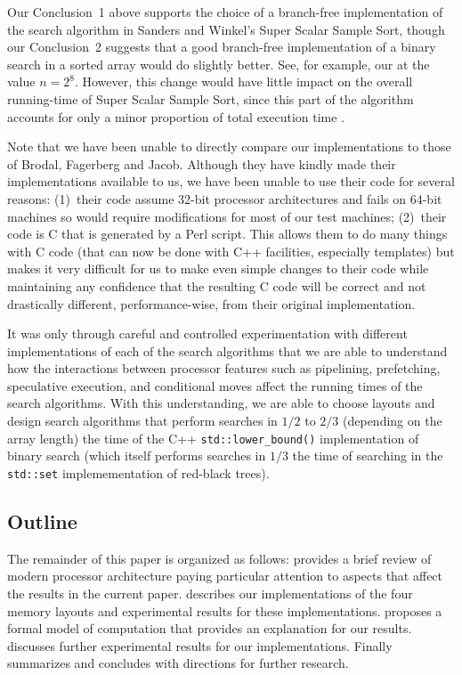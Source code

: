\documentclass{patmorin}
\begin{document}
Our Conclusion~1 above supports the choice of a branch-free implementation
of the search algorithm in Sanders and Winkel's Super Scalar Sample Sort,
though our Conclusion~2 suggests that a good branch-free implementation
of a binary search in a sorted array would do slightly better. See,
for example, our  at the value $n=2^8$.
However, this change would have little impact on the overall
running-time of Super Scalar Sample Sort, since this part of the
algorithm accounts for only a minor proportion of total execution time
\cite[Figure~3]{sanders.winkel:super}. 

Note that we have been unable to directly compare our implementations
to those of Brodal, Fagerberg and Jacob. Although they have kindly
made their implementations available to us, we have been unable to use
their code for several reasons: (1)~their code assume 32-bit processor
architectures and fails on 64-bit machines so would require modifications
for most of our test machines; (2)~their code is C that is generated
by a Perl script. This allows them to do many things with C code (that
can now be done with C++ facilities, especially templates) but makes it
very difficult for us to make even simple changes to their code while
maintaining any confidence that the resulting C code will be correct
and not drastically different, performance-wise, from their original
implementation.

It was only through careful and controlled experimentation with
different implementations of each of the search algorithms that
we are able to understand how the interactions between processor
features such as pipelining, prefetching, speculative execution, and
conditional moves affect the running times of the search algorithms.
With this understanding, we are able to choose layouts and design search
algorithms that perform searches in $1/2$ to $2/3$ (depending on the
array length) the time of the C++ \texttt{std::lower_bound()}
implementation of binary search (which itself performs searches in $1/3$
the time of searching in the \texttt{std::set} implemementation of
red-black trees).

\subsection{Outline}

The remainder of this paper is organized as follows: 
provides a brief review of modern processor architecture paying particular
attention to aspects that affect the results in the current paper.
 describes our implementations of the four memory layouts
and experimental results for these implementations. 
proposes a formal model of computation that provides an explanation for
our results.   discusses further experimental results
for our implementations.  Finally  summarizes and
concludes with directions for further research.
\end{document}
